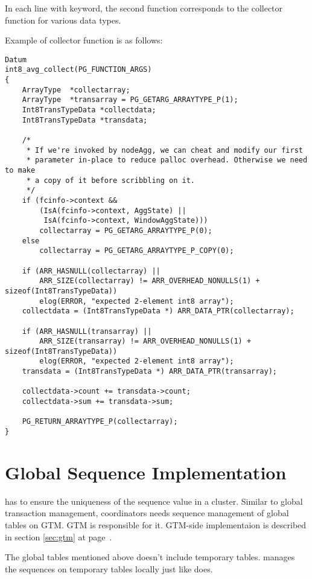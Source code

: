   In each line with  keyword, the second function corresponds to the collector function for various data types.

  Example of collector function is as follows:

  \begin{lstlisting}[tabsize=4, frame=single]
Datum
int8_avg_collect(PG_FUNCTION_ARGS)
{
	ArrayType  *collectarray;
	ArrayType  *transarray = PG_GETARG_ARRAYTYPE_P(1);
	Int8TransTypeData *collectdata;
	Int8TransTypeData *transdata;

	/*
	 * If we're invoked by nodeAgg, we can cheat and modify our first
	 * parameter in-place to reduce palloc overhead. Otherwise we need to make
	 * a copy of it before scribbling on it.
	 */
	if (fcinfo->context &&
		(IsA(fcinfo->context, AggState) ||
		 IsA(fcinfo->context, WindowAggState)))
		collectarray = PG_GETARG_ARRAYTYPE_P(0);
	else
		collectarray = PG_GETARG_ARRAYTYPE_P_COPY(0);

	if (ARR_HASNULL(collectarray) ||
	    ARR_SIZE(collectarray) != ARR_OVERHEAD_NONULLS(1) + sizeof(Int8TransTypeData))
		elog(ERROR, "expected 2-element int8 array");
	collectdata = (Int8TransTypeData *) ARR_DATA_PTR(collectarray);

	if (ARR_HASNULL(transarray) ||
	    ARR_SIZE(transarray) != ARR_OVERHEAD_NONULLS(1) + sizeof(Int8TransTypeData))
		elog(ERROR, "expected 2-element int8 array");
	transdata = (Int8TransTypeData *) ARR_DATA_PTR(transarray);

	collectdata->count += transdata->count;
	collectdata->sum += transdata->sum;

	PG_RETURN_ARRAYTYPE_P(collectarray);
}
  \end{lstlisting}

\section{\label{sec:seqExec}Global Sequence Implementation}

  \XC{} has to ensure the uniqueness of the sequence value in a cluster.
  Similar to global transaction management, coordinators needs sequence management
  of global tables on GTM.
  GTM is responsible for it.
  GTM-side implementaion is described in section \ref{sec:gtm} at page~\pageref{sec:gtm}.

  The global tables mentioned above doesn't include temporary tables.
  \XC{} manages the sequences on temporary tables locally just
   like \PG{} does.

